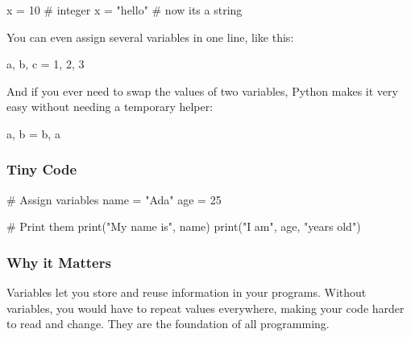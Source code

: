 \documentclass[
  letterpaper,
  DIV=11,
  numbers=noendperiod]{scrreprt}
\newenvironment{Shaded}{\begin{snugshade}}{\end{snugshade}}
\newcommand{\BuiltInTok}[1]{\textcolor[rgb]{0.00,0.23,0.31}{#1}}
\newcommand{\CommentTok}[1]{\textcolor[rgb]{0.37,0.37,0.37}{#1}}
\newcommand{\DecValTok}[1]{\textcolor[rgb]{0.68,0.00,0.00}{#1}}
\newcommand{\NormalTok}[1]{\textcolor[rgb]{0.00,0.23,0.31}{#1}}
\newcommand{\OperatorTok}[1]{\textcolor[rgb]{0.37,0.37,0.37}{#1}}
\newcommand{\StringTok}[1]{\textcolor[rgb]{0.13,0.47,0.30}{#1}}
\begin{document}
\begin{Shaded}
\begin{Highlighting}[]
\NormalTok{x }\OperatorTok{=} \DecValTok{10}      \CommentTok{\# integer}
\NormalTok{x }\OperatorTok{=} \StringTok{"hello"} \CommentTok{\# now it\textquotesingle{}s a string}
\end{Highlighting}
\end{Shaded}

You can even assign several variables in one line, like this:

\begin{Shaded}
\begin{Highlighting}[]
\NormalTok{a, b, c }\OperatorTok{=} \DecValTok{1}\NormalTok{, }\DecValTok{2}\NormalTok{, }\DecValTok{3}
\end{Highlighting}
\end{Shaded}

And if you ever need to swap the values of two variables, Python makes
it very easy without needing a temporary helper:

\begin{Shaded}
\begin{Highlighting}[]
\NormalTok{a, b }\OperatorTok{=}\NormalTok{ b, a}
\end{Highlighting}
\end{Shaded}

\subsubsection{Tiny Code}\label{tiny-code-4}

\begin{Shaded}
\begin{Highlighting}[]
\CommentTok{\# Assign variables}
\NormalTok{name }\OperatorTok{=} \StringTok{"Ada"}
\NormalTok{age }\OperatorTok{=} \DecValTok{25}

\CommentTok{\# Print them}
\BuiltInTok{print}\NormalTok{(}\StringTok{"My name is"}\NormalTok{, name)}
\BuiltInTok{print}\NormalTok{(}\StringTok{"I am"}\NormalTok{, age, }\StringTok{"years old"}\NormalTok{)}
\end{Highlighting}
\end{Shaded}

\subsubsection{Why it Matters}\label{why-it-matters-4}

Variables let you store and reuse information in your programs. Without
variables, you would have to repeat values everywhere, making your code
harder to read and change. They are the foundation of all programming.
\end{document}
